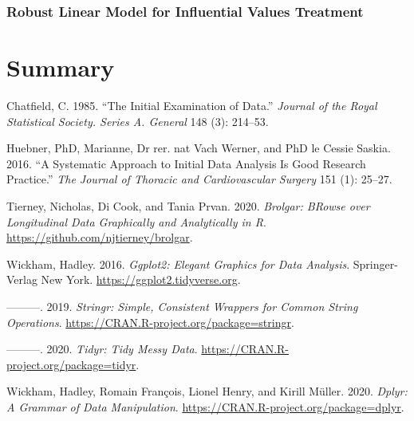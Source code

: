 \documentclass{article}
\begin{document}
\hypertarget{robust-linear-model-for-influential-values-treatment}{%
\subsubsection{Robust Linear Model for Influential Values
Treatment}\label{robust-linear-model-for-influential-values-treatment}}

\hypertarget{summary}{%
\section*{Summary}\label{summary}}

\hypertarget{refs}{}
\leavevmode\hypertarget{ref-Chatfield1985TIEo}{}%
Chatfield, C. 1985. ``The Initial Examination of Data.'' \emph{Journal
of the Royal Statistical Society. Series A. General} 148 (3): 214--53.

\leavevmode\hypertarget{ref-HuebnerMariannePhD2016Asat}{}%
Huebner, PhD, Marianne, Dr rer. nat Vach Werner, and PhD le Cessie
Saskia. 2016. ``A Systematic Approach to Initial Data Analysis Is Good
Research Practice.'' \emph{The Journal of Thoracic and Cardiovascular
Surgery} 151 (1): 25--27.

\leavevmode\hypertarget{ref-brolgar}{}%
Tierney, Nicholas, Di Cook, and Tania Prvan. 2020. \emph{Brolgar: BRowse
over Longitudinal Data Graphically and Analytically in R}.
\url{https://github.com/njtierney/brolgar}.

\leavevmode\hypertarget{ref-ggplot2}{}%
Wickham, Hadley. 2016. \emph{Ggplot2: Elegant Graphics for Data
Analysis}. Springer-Verlag New York.
\url{https://ggplot2.tidyverse.org}.

\leavevmode\hypertarget{ref-stringr}{}%
---------. 2019. \emph{Stringr: Simple, Consistent Wrappers for Common
String Operations}. \url{https://CRAN.R-project.org/package=stringr}.

\leavevmode\hypertarget{ref-tidyr}{}%
---------. 2020. \emph{Tidyr: Tidy Messy Data}.
\url{https://CRAN.R-project.org/package=tidyr}.

\leavevmode\hypertarget{ref-dplyr}{}%
Wickham, Hadley, Romain François, Lionel Henry, and Kirill Müller. 2020.
\emph{Dplyr: A Grammar of Data Manipulation}.
\url{https://CRAN.R-project.org/package=dplyr}.



\end{document}
